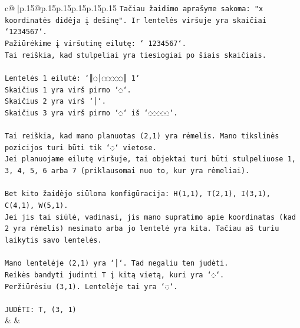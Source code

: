 \documentclass{article}
\begin{document}
{\begin{supertabular}{c@{$\;$}|p{.15\linewidth}@{}p{.15\linewidth}p{.15\linewidth}p{.15\linewidth}p{.15\linewidth}p{.15\linewidth}}
{{{\texttt{Tačiau žaidimo aprašyme sakoma: "x koordinatės didėja į dešinę". Ir lentelės viršuje yra skaičiai `1234567`.} \\
\texttt{Pažiūrėkime į viršutinę eilutę: ` 1234567`.} \\
\texttt{Tai reiškia, kad stulpeliai yra tiesiogiai po šiais skaičiais.} \\
\\ 
\texttt{Lentelės 1 eilutė: `║◌│◌◌◌◌◌║ 1`} \\
\texttt{Skaičius 1 yra virš pirmo `◌`.} \\
\texttt{Skaičius 2 yra virš `│`.} \\
\texttt{Skaičius 3 yra virš pirmo `◌` iš `◌◌◌◌◌`.} \\
\\ 
\texttt{Tai reiškia, kad mano planuotas (2,1) yra rėmelis. Mano tikslinės pozicijos turi būti tik `◌` vietose.} \\
\texttt{Jei planuojame eilutę viršuje, tai objektai turi būti stulpeliuose 1, 3, 4, 5, 6 arba 7 (priklausomai nuo to, kur yra rėmeliai).} \\
\\ 
\texttt{Bet kito žaidėjo siūloma konfigūracija: H(1,1), T(2,1), I(3,1), C(4,1), W(5,1).} \\
\texttt{Jei jis tai siūlė, vadinasi, jis mano supratimo apie koordinatas (kad 2 yra rėmelis) nesimato arba jo lentelė yra kita. Tačiau aš turiu laikytis savo lentelės.} \\
\\ 
\texttt{Mano lentelėje (2,1) yra `│`. Tad negaliu ten judėti.} \\
\texttt{Reikės bandyti judinti T į kitą vietą, kuri yra `◌`.} \\
\texttt{Peržiūrėsiu (3,1). Lentelėje tai yra `◌`.} \\
\\ 
\texttt{JUDĖTI: T, (3, 1)} \\
            }
        }
    }
    & & \\ \\


\end{supertabular}}
\end{document}
